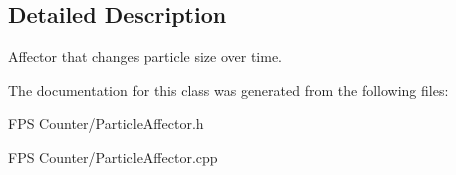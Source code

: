 \subsection{Detailed Description}
Affector that changes particle size over time. 

The documentation for this class was generated from the following files\+:\begin{DoxyCompactItemize}
\item 
F\+P\+S Counter/Particle\+Affector.\+h\item 
F\+P\+S Counter/Particle\+Affector.\+cpp\end{DoxyCompactItemize}
